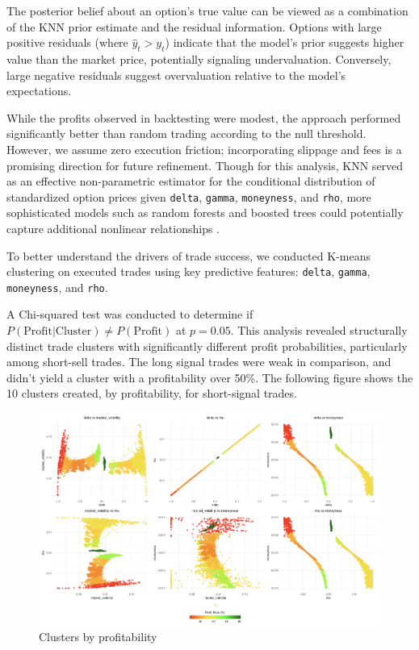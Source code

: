 \documentclass{article}
\begin{document}
The posterior belief about an option's true value can be viewed as a combination of the KNN prior estimate and the residual information. Options with large positive residuals (where $\hat{y}_t > y_t$) indicate that the model's prior suggests higher value than the market price, potentially signaling undervaluation. Conversely, large negative residuals suggest overvaluation relative to the model's expectations.

While the profits observed in backtesting were modest, the approach performed significantly better than random trading according to the null threshold. However, we assume zero execution friction; incorporating slippage and fees is a promising direction for future refinement. Though for this analysis, KNN served as an effective non-parametric estimator for the conditional distribution of standardized option prices given \verb|delta|, \verb|gamma|, \verb|moneyness|, and \verb|rho|, more sophisticated models such as random forests and boosted trees could potentially capture additional nonlinear relationships \cite{caruana2006empirical}.

To better understand the drivers of trade success, we conducted K-means clustering on executed trades using key predictive features: \verb|delta|, \verb|gamma|, \verb|moneyness|, and \verb|rho|. 

A Chi-squared test was conducted to determine if $P(\text{Profit} | \text{Cluster}) \neq P(\text{Profit})$ at $p=0.05$. This analysis revealed structurally distinct trade clusters with significantly different profit probabilities, particularly among short-sell trades. The long signal trades were weak in comparison, and didn't yield a cluster with a profitability over 50\%. The following figure shows the 10 clusters created, by profitability, for short-signal trades.

\begin{figure}[h]
  \centering
  \includegraphics[width=1\linewidth]{data/results/clusters.png}
  \caption{Clusters by profitability}
  \label{fig:clusters}
\end{figure}
\end{document}
